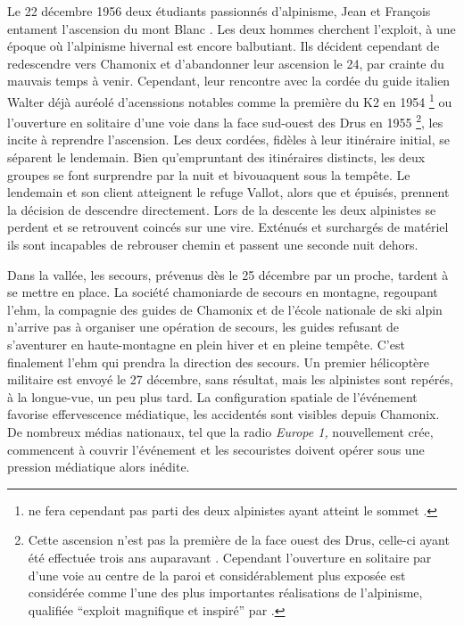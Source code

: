 Le 22 décembre 1956 deux étudiants passionnés d'alpinisme, Jean
 et François  entament l’ascension du mont
Blanc \autocite{Ballu1997}. Les deux hommes cherchent l'exploit, à une
époque où l'alpinisme hivernal est encore balbutiant. Ils décident
cependant de redescendre vers Chamonix et d'abandonner leur ascension
le 24, par crainte du mauvais temps à venir. Cependant, leur rencontre
avec la cordée du guide italien Walter  déjà auréolé
d'acenssions notables comme la première du K2 en 1954
\footnote{ ne fera cependant pas parti des deux
  alpinistes ayant atteint le sommet
  \autocite{ContributeursWikipedia2020a}.} ou l'ouverture en solitaire
d'une voie dans la face sud-ouest des Drus en 1955 \footnote{Cette
  ascension n'est pas la première de la face ouest des Drus, celle-ci
  ayant été effectuée trois ans auparavant
  \autocite{ContributeursWikipedia2020}. Cependant l'ouverture en
  solitaire par  d'une voie au centre de la paroi et
  considérablement plus exposée est considérée comme l'une des plus
  importantes réalisations de l'alpinisme, qualifiée
  \enquote{exploit magnifique et inspiré} par
  \textcite{Robbins2000}.}, les incite à reprendre l’ascension. Les
deux cordées, fidèles à leur itinéraire initial, se séparent le
lendemain. Bien qu'empruntant des itinéraires distincts, les deux
groupes se font surprendre par la nuit et bivouaquent sous la
tempête. Le lendemain  et son client atteignent le refuge
Vallot, alors que  et  épuisés, prennent la
décision de descendre directement. Lors de la descente les deux
alpinistes se perdent et se retrouvent coincés sur une
\gls{vire}. Exténués et surchargés de matériel ils sont incapables de
rebrouser chemin et passent une seconde nuit dehors.

Dans la vallée, les secours, prévenus dès le 25 décembre par un
proche, tardent à se mettre en place. La société chamoniarde de
secours en montagne, regoupant l'\ac{ehm}, la compagnie des guides de
Chamonix et de l'école nationale de ski alpin n'arrive pas à organiser
une opération de secours, les guides refusant de s'aventurer en
haute-montagne en plein hiver et en pleine tempête. C'est finalement
l'\ac{ehm} qui prendra la direction des secours. Un premier
hélicoptère militaire est envoyé le 27 décembre, sans résultat, mais
les alpinistes sont repérés, à la longue-vue, un peu plus tard. La
configuration spatiale de l'événement favorise effervescence
médiatique, les accidentés sont visibles depuis Chamonix. De nombreux
médias nationaux, tel que la radio \emph{Europe 1,} nouvellement crée,
commencent à couvrir l'événement et les secouristes doivent opérer
sous une pression médiatique alors inédite.

